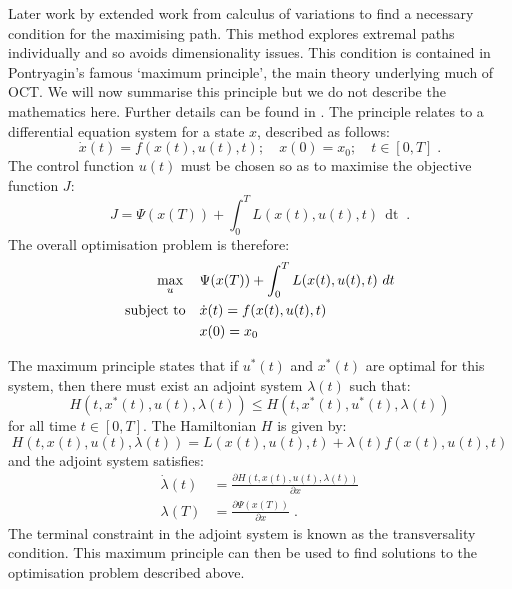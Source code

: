 Later work by \citet{pontryagin_mathematical_1962} extended work from calculus of variations to find a necessary condition for the maximising path. This method explores extremal paths individually and so avoids dimensionality issues. This condition is contained in Pontryagin's famous `maximum principle', the main theory underlying much of OCT. We will now summarise this principle but we do not describe the mathematics here. Further details can be found in \citet{lenhart_optimal_2007}. The principle relates to a differential equation system for a state $x$, described as follows:
\begin{equation}
    \dot{x}(t) = f(x(t), u(t), t);\quad{}x(0)=x_0;\quad{}t\in{}\left[0, T\right]\;.
\end{equation}
The control function $u(t)$ must be chosen so as to maximise the objective function $J$:
\begin{equation}
    J = \Psi{}(x(T)) + \int_0^TL(x(t), u(t), t)\,\mathop{dt}\;.
\end{equation}
The overall optimisation problem is therefore:
\begin{subequations}\label{eqn:ch2:opt_problem}
    \begin{align}
        \max_u \quad{} &\null \Psi{}(x(T)) + \int_0^TL(x(t), u(t), t)\,\mathop{dt} \label{eqn:ch2:opt_problem_a}\\
        \text{subject to} \quad{} &\null \dot{x}(t) = f(x(t), u(t), t) \label{eqn:ch2:opt_problem_b}\\
        &\null x(0)=x_0 \label{eqn:ch2:opt_problem_c}
    \end{align}
\end{subequations}

The maximum principle states that if $u^*(t)$ and $x^*(t)$ are optimal for this system, then there must exist an adjoint system $\lambda(t)$ such that:
\begin{equation}
    H(t, x^*(t), u(t), \lambda(t)) \leq H(t, x^*(t), u^*(t), \lambda(t))
\end{equation}
for all time $t \in \left[0, T\right]$. The Hamiltonian $H$ is given by:
\begin{equation}\label{eqn:ch2:hamiltonian_general}
    H(t, x(t), u(t), \lambda(t)) = L(x(t), u(t), t) + \lambda(t)f(x(t), u(t), t)
\end{equation}
and the adjoint system satisfies:
\begin{subequations}\label{eqn:ch2:adjoint_system}
    \begin{align}
        \dot{\lambda}(t) &= \frac{\partial H(t, x(t), u(t), \lambda(t))}{\partial x} \label{eqn:ch2:adjoint_system_a}\\
        \lambda(T) &= \frac{\partial \Psi(x(T))}{\partial x}\;. \label{eqn:ch2:adjoint_system_b}
    \end{align}
\end{subequations}
The terminal constraint in the adjoint system is known as the transversality condition. This maximum principle can then be used to find solutions to the optimisation problem described above.

